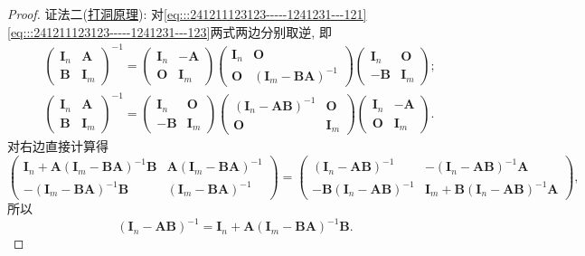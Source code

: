 \documentclass[../../main.tex]{subfiles}%
\begin{document}
\begin{proof}
{\color{blue}证法二(\hyperref[proposition:打洞原理]{打洞原理}):}
对\eqref{eq:::241211123123-----1241231---121}\eqref{eq:::241211123123-----1241231---123}两式两边分别取逆, 即
\begin{align*}
&\begin{pmatrix} \boldsymbol{I}_n & \boldsymbol{A} \\ \boldsymbol{B} & \boldsymbol{I}_m \end{pmatrix}^{-1} = \begin{pmatrix} \boldsymbol{I}_n & -\boldsymbol{A} \\ \boldsymbol{O} & \boldsymbol{I}_m \end{pmatrix} \begin{pmatrix} \boldsymbol{I}_n & \boldsymbol{O} \\ \boldsymbol{O} & (\boldsymbol{I}_m - \boldsymbol{BA})^{-1} \end{pmatrix} \begin{pmatrix} \boldsymbol{I}_n & \boldsymbol{O} \\ -\boldsymbol{B} & \boldsymbol{I}_m \end{pmatrix};
\\
&\begin{pmatrix} \boldsymbol{I}_n & \boldsymbol{A} \\ \boldsymbol{B} & \boldsymbol{I}_m \end{pmatrix}^{-1} 
= \begin{pmatrix} \boldsymbol{I}_n & \boldsymbol{O} \\ -\boldsymbol{B} & \boldsymbol{I}_m \end{pmatrix} \begin{pmatrix} (\boldsymbol{I}_n - \boldsymbol{AB})^{-1} & \boldsymbol{O} \\ \boldsymbol{O} & \boldsymbol{I}_m \end{pmatrix} \begin{pmatrix} \boldsymbol{I}_n & -\boldsymbol{A} \\ \boldsymbol{O} & \boldsymbol{I}_m \end{pmatrix}.
\end{align*}
对右边直接计算得
\[
\begin{pmatrix} \boldsymbol{I}_n + \boldsymbol{A}(\boldsymbol{I}_m - \boldsymbol{BA})^{-1}\boldsymbol{B} & \boldsymbol{A}(\boldsymbol{I}_m - \boldsymbol{BA})^{-1} \\ -(\boldsymbol{I}_m - \boldsymbol{BA})^{-1}\boldsymbol{B} & (\boldsymbol{I}_m - \boldsymbol{BA})^{-1} \end{pmatrix}
= \begin{pmatrix} (\boldsymbol{I}_n - \boldsymbol{AB})^{-1} & -(\boldsymbol{I}_n - \boldsymbol{AB})^{-1}\boldsymbol{A} \\ -\boldsymbol{B}(\boldsymbol{I}_n - \boldsymbol{AB})^{-1} & \boldsymbol{I}_m + \boldsymbol{B}(\boldsymbol{I}_n - \boldsymbol{AB})^{-1}\boldsymbol{A} \end{pmatrix},
\]
所以
\[
(\boldsymbol{I}_n - \boldsymbol{AB})^{-1} = \boldsymbol{I}_n + \boldsymbol{A}(\boldsymbol{I}_m - \boldsymbol{BA})^{-1}\boldsymbol{B}.
\]

\end{proof}
\end{document}
